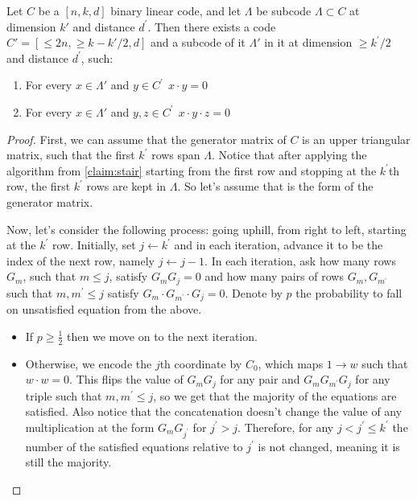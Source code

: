 \documentclass[manuscript,screen,review]{acmart}
\begin{document}
\begin{claim} 
  \label{claim:commute}
  Let $C$ be a $[n,k,d]$ binary linear code, and let $\Lambda$ be subcode $\Lambda \subset C$ at dimension $k'$ and distance $d^{\prime}$. Then there exists a code $C' = [\leq 2n, \geq k-k'/2, d]$ and a subcode of it $\Lambda' $ in it at dimension $\ge k^{\prime}/2$ and distance $d^{\prime}$, such:
  \begin{enumerate}
      \label{property:prop}
    \item For every $x \in \Lambda'$ and $y \in C^{\prime} \ \ x\cdot y = 0$
    \item For every $x \in \Lambda'$ and $y,z \in C^{\prime} \ \ x \cdot y \cdot z =0 $
  \end{enumerate}
\end{claim}
\begin{proof} 
  First, we can assume that the generator matrix of $C$ is an upper triangular matrix, such that the first $k^\prime$ rows span $\Lambda$. Notice that after applying the algorithm from \cref{claim:stair} starting from the first row and stopping at the $k^{\prime}$th row, the first $k^{\prime}$ rows are kept in $\Lambda$. So let's assume that is the form of the generator matrix. 

  
  Now, let's consider the following process: going uphill, from right to left, starting at the $k^\prime$ row. Initially, set $j \leftarrow k^{\prime}$ and in each iteration, advance it to be the index of the next row, namely $j\leftarrow j - 1$. In each iteration, ask how many rows $G_{m}$, such that $m \le j$, satisfy $G_{m} G_{j} = 0$ and how many pairs of rows $G_{m},G_{m^{\prime}}$ such that $m,m^{\prime}\le j$ satisfy $G_{m}\cdot G_{m^{\prime}} \cdot G_{j} = 0$. Denote by $p$ the probability to fall on unsatisfied equation from the above.  
  \begin{itemize}
    \item If $p \ge \frac{1}{2}$ then we move on to the next iteration. 
    \item Otherwise, we encode the $j$th coordinate by $C_{0}$, which maps $1 \rightarrow w$ such that $w\cdot w = 0$. This flips the value of $G_{m} G_{j}$ for any pair and $G_{m} G_{m^{\prime}} G_{j}$ for any triple such that $m,m^{\prime} \le j$, so we get that the majority of the equations are satisfied. Also notice that the concatenation doesn't change the value of any multiplication at the form $G_{m}G_{j^{\prime}}$ for $j^{\prime}> j$. Therefore, for any $j< j^{\prime}\le k^{\prime}$ the number of the satisfied equations relative to $j^{\prime}$ is not changed, meaning it is still the majority.


\end{itemize}
\end{proof}
\end{document}

